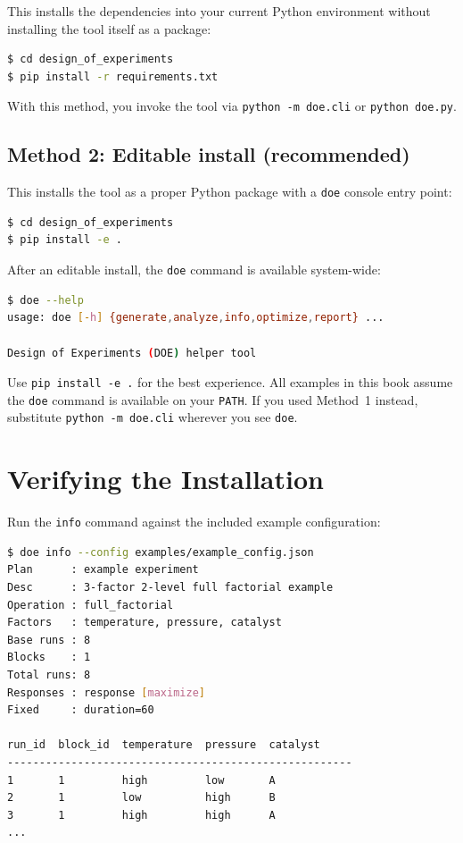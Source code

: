 \documentclass[11pt]{book}
\begin{document}
This installs the dependencies into your current Python environment without installing the tool itself as a package:

\begin{lstlisting}[language=bash]
$ cd design_of_experiments
$ pip install -r requirements.txt
\end{lstlisting}

With this method, you invoke the tool via \texttt{python -m doe.cli} or \texttt{python doe.py}.

\subsection{Method 2: Editable install (recommended)}

This installs the tool as a proper Python package with a \texttt{doe} console entry point:

\begin{lstlisting}[language=bash]
$ cd design_of_experiments
$ pip install -e .
\end{lstlisting}

After an editable install, the \texttt{doe} command is available system-wide:

\begin{lstlisting}[language=bash]
$ doe --help
usage: doe [-h] {generate,analyze,info,optimize,report} ...

Design of Experiments (DOE) helper tool
\end{lstlisting}

\begin{keypoint}
Use \texttt{pip install -e .} for the best experience. All examples in this book assume the \texttt{doe} command is available on your \texttt{PATH}. If you used Method~1 instead, substitute \texttt{python -m doe.cli} wherever you see \texttt{doe}.
\end{keypoint}

\section{Verifying the Installation}

Run the \texttt{info} command against the included example configuration:

\begin{lstlisting}[language=bash]
$ doe info --config examples/example_config.json
Plan      : example experiment
Desc      : 3-factor 2-level full factorial example
Operation : full_factorial
Factors   : temperature, pressure, catalyst
Base runs : 8
Blocks    : 1
Total runs: 8
Responses : response [maximize]
Fixed     : duration=60

run_id  block_id  temperature  pressure  catalyst
------------------------------------------------------
1       1         high         low       A
2       1         low          high      B
3       1         high         high      A
...
\end{lstlisting}
\end{document}
